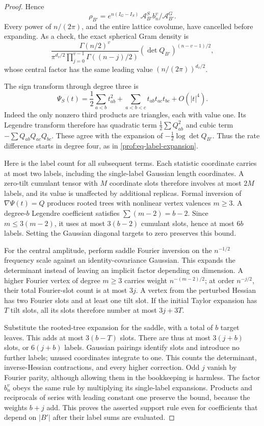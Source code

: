 \begin{proof}
Hence
\[
 \rho_{B'}=
 e^{n(I_G-I_S)}\,
       \mathcal A^S_{B'}b_n^v/\mathcal A^G_{B'}.
\]
Every power of \(n/(2\pi)\), and the entire lattice covolume, have
cancelled before expanding.  As a check, the exact spherical Gram density is
\[
 \frac{\Gamma(n/2)^v}
 {\pi^{d_v/2}\prod_{j=0}^{v-1}\Gamma((n-j)/2)}
 (\det Q_{B'})^{(n-v-1)/2},
\]
whose central factor has the same leading value
\((n/(2\pi))^{d_v/2}\).

The sign transform through degree three is
\[
 \Psi_S(t)=\frac12\sum_{a<b}t_{ab}^2
       +\sum_{a<b<c}t_{ab}t_{ac}t_{bc}+O(|t|^4).
\]
Indeed the only nonzero third products are triangles, each with value
one.  Its Legendre transform therefore has quadratic term
\(\tfrac12\sum Q_{ab}^2\) and cubic term
\(-\sum Q_{ab}Q_{ac}Q_{bc}\).  These agree with the expansion of
\(-\tfrac12\log\det Q_{B'}\).  Thus the rate difference starts in
degree four, as in \eqref{prof:eq-label-expansion}.

Here is the label count for all subsequent terms.  Each statistic
coordinate carries at most two labels, including the single-label
Gaussian length coordinates.  A zero-tilt cumulant tensor with \(M\)
coordinate slots therefore involves at most \(2M\) labels, and its
value is unaffected by additional replicas.  Formal inversion of
\(\nabla\Psi(t)=Q\) produces rooted trees with nonlinear vertex valences
\(m\ge3\).  A degree-\(b\) Legendre coefficient satisfies
\(\sum(m-2)=b-2\).  Since \(m\le3(m-2)\), it uses at most
\(3(b-2)\) cumulant slots, hence at most \(6b\) labels.  Setting the
Gaussian diagonal targets to zero preserves this bound.

For the central amplitude, perform saddle Fourier inversion on the
\(n^{-1/2}\) frequency scale against an identity-covariance Gaussian.
This expands the determinant instead of leaving an implicit
factor depending on dimension.  A higher Fourier vertex of degree
\(m\ge3\) carries weight \(n^{-(m-2)/2}\); at order
\(n^{-j/2}\), their total Fourier-slot count is at most \(3j\).
A vertex from the perturbed Hessian has two Fourier slots and at least
one tilt slot.  If the initial Taylor expansion has \(T\) tilt slots,
all its slots therefore number at most \(3j+3T\).

Substitute the
rooted-tree expansion for the saddle, with a total of \(b\) target
leaves.  This adds at most \(3(b-T)\) slots.  There are thus at most
\(3(j+b)\) slots, or \(6(j+b)\) labels.  Gaussian pairings identify
slots and introduce no further labels; unused coordinates integrate
to one.  This counts the determinant, inverse-Hessian contractions,
and every higher correction.  Odd \(j\) vanish by Fourier parity,
although allowing them in the bookkeeping is harmless.
The factor \(b_n^v\) obeys the same rule by multiplying its
single-label expansions.  Products and reciprocals of series with
leading constant one preserve the bound, because the weights \(b+j\)
add.  This proves the asserted support rule even for coefficients
that depend on \(|B'|\) after their label sums are evaluated.


\end{proof}
